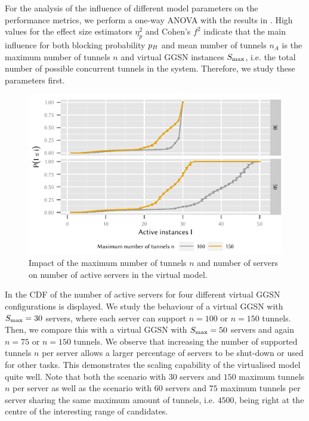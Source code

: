 For the analysis of the influence of different model parameters on the performance metrics, we perform a one-way ANOVA with the results in .
High values for the effect size estimators \(\eta_p^2\) and Cohen's \(f^2\)\cite{Ellis2010} indicate that the main influence for both blocking probability \(p_B\) and mean number of tunnels \(n_A\) is the maximum number of tunnels \(n\) and virtual \gls{GGSN} instances \(S_{\max}\), i.e. the total number of possible concurrent tunnels in the system.
Therefore, we study these parameters first.

\begin{figure}
  \centering
  \includegraphics{cloud/virtualized_network_functions/performance_evaluation/figures/instanceuse_multiserver}
  \caption{Impact of the maximum number of tunnels \(n\) and number of servers \maxServers on number of active servers in the virtual  model.}
  \label{fig:cloud:virtualized_network_functions:performance_evaluation:virtual_ggsn:instanceuse_multiserver}
\end{figure}

In  the \gls{CDF} of the number of active servers for four different virtual \gls{GGSN} configurations is displayed.
We study the behaviour of a virtual \gls{GGSN} with \(S_{\max} = 30\) servers, where each server can support \(n = 100\) or \(n = 150\) tunnels.
Then, we compare this with a virtual \gls{GGSN} with \(S_{\max} = 50\) servers and again \(n = 75\) or \(n = 150\) tunnels.
We observe that increasing the number of supported tunnels \(n\) per server allows a larger percentage of servers to be shut-down or used for other tasks. This demonstrates the scaling capability of the virtualised model quite well.
Note that both the scenario with \(30\) servers \maxServers and \(150\) maximum tunnels \(n\) per server as well as the scenario with \(60\) servers \maxServers and \(75\) maximum tunnels per server sharing the same maximum amount of tunnels, i.e. \(4500\), being right at the centre of the interesting range of candidates.

